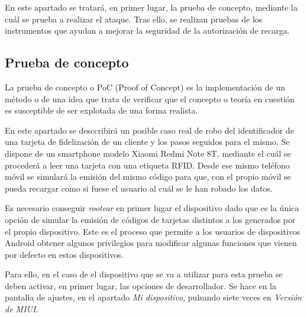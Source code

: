 \documentclass[12pt,a4paper,onecolumn,oneside]{report}
\begin{document}
En este apartado se tratará, en primer lugar, la prueba de concepto, mediante la cuál se prueba a realizar el ataque. Tras ello, se realizan pruebas de los instrumentos que ayudan a mejorar la seguridad de la autorización de recarga.

\subsection{Prueba de concepto}

La prueba de concepto o PoC (Proof of Concept) es la implementación de un método o de una idea que trata de verificar que el concepto o teoría en cuestión es susceptible de ser explotada de una forma realista.

En este apartado se desccribirá un posible caso real de robo del identificador de una tarjeta de fidelización de un cliente y los pasos seguidos para el mismo. Se dispone de un smartphone modelo Xiaomi Redmi Note 8T, mediante el cuál se procederá a leer una tarjeta con una etiqueta RFID. Desde ese mismo teléfono móvil se simulará la emisión del mismo código para que, con el propio móvil se pueda recargar como si fuese el usuario al cuál se le han robado los datos.

Es necesario conseguir \textit{rootear} en primer lugar el dispositivo dado que es la única opción de simular la emisión de códigos de tarjetas distintos a los generados por el propio dispositivo. Este es el proceso que permite a los usuarios de dispositivos Android obtener algunos privilegios para modificar algunas funciones que vienen por defecto en estos dispositivos.

Para ello, en el caso de el dispositivo que se va a utilizar para esta prueba se deben activar, en primer lugar, las opciones de desarrollador. Se hace en la pantalla de ajustes, en el apartado \textit{Mi dispositivo}, pulsando siete veces en \textit{Versión de MIUI}.
\end{document}
